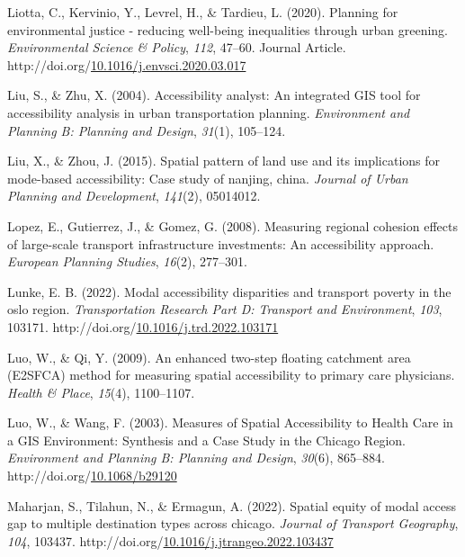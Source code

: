 \documentclass[
11pt, %
oneside, %
english, %
singlespacing, %
]{macthesis} %
\newlength{\cslhangindent}
\newenvironment{CSLReferences}[2] %
{\begin{list}{}{%
	\setlength{\itemindent}{0pt}
	\setlength{\leftmargin}{0pt}
	\setlength{\parsep}{0pt}
	\ifodd #1
	\setlength{\leftmargin}{\cslhangindent}
	\setlength{\itemindent}{-1\cslhangindent}
	\fi
	\setlength{\itemsep}{#2\baselineskip}}}
{\end{list}}
\begin{document}
\begin{CSLReferences}{1}{0}
Liotta, C., Kervinio, Y., Levrel, H., \& Tardieu, L. (2020). Planning for environmental justice - reducing well-being inequalities through urban greening. \emph{Environmental Science \& Policy}, \emph{112}, 47--60. Journal Article. http://doi.org/\href{https://doi.org/10.1016/j.envsci.2020.03.017}{10.1016/j.envsci.2020.03.017}

Liu, S., \& Zhu, X. (2004). Accessibility analyst: An integrated GIS tool for accessibility analysis in urban transportation planning. \emph{Environment and Planning B: Planning and Design}, \emph{31}(1), 105--124.

Liu, X., \& Zhou, J. (2015). Spatial pattern of land use and its implications for mode-based accessibility: Case study of nanjing, china. \emph{Journal of Urban Planning and Development}, \emph{141}(2), 05014012.

Lopez, E., Gutierrez, J., \& Gomez, G. (2008). Measuring regional cohesion effects of large-scale transport infrastructure investments: {An} accessibility approach. \emph{European Planning Studies}, \emph{16}(2), 277--301.

Lunke, E. B. (2022). Modal accessibility disparities and transport poverty in the oslo region. \emph{Transportation Research Part D: Transport and Environment}, \emph{103}, 103171. http://doi.org/\href{https://doi.org/10.1016/j.trd.2022.103171}{10.1016/j.trd.2022.103171}

Luo, W., \& Qi, Y. (2009). An enhanced two-step floating catchment area ({E2SFCA}) method for measuring spatial accessibility to primary care physicians. \emph{Health \& Place}, \emph{15}(4), 1100--1107.

Luo, W., \& Wang, F. (2003). Measures of Spatial Accessibility to Health Care in a GIS Environment: Synthesis and a Case Study in the Chicago Region. \emph{Environment and Planning B: Planning and Design}, \emph{30}(6), 865--884. http://doi.org/\href{https://doi.org/10.1068/b29120}{10.1068/b29120}

Maharjan, S., Tilahun, N., \& Ermagun, A. (2022). Spatial equity of modal access gap to multiple destination types across chicago. \emph{Journal of Transport Geography}, \emph{104}, 103437. http://doi.org/\href{https://doi.org/10.1016/j.jtrangeo.2022.103437}{10.1016/j.jtrangeo.2022.103437}


\end{CSLReferences}
\end{document}
